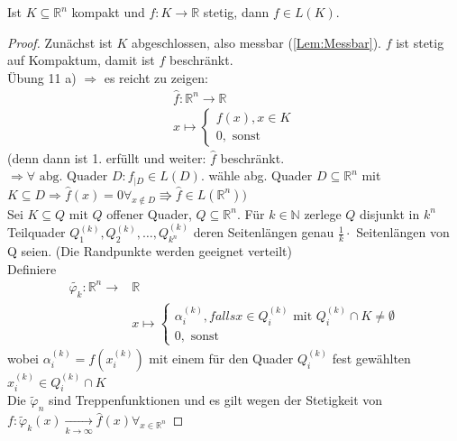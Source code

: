 \begin{satz}
    Ist $K\subseteq\mathbb{R}^n$ kompakt und $f\colon K\to\mathbb{R}$ stetig, dann $f\in L(K)$.
\end{satz}

\begin{proof}
        Zunächst ist $K$ abgeschlossen, also messbar (\ref{Lem:Messbar}). $f$ ist stetig auf Kompaktum, damit ist $f$ beschränkt.\\
        Übung 11 a) $\Rightarrow$ es reicht zu zeigen: \begin{align*}
            \hat{f}\colon \mathbb{R}^n\to\mathbb{R}\\
            x\mapsto\left\{\begin{matrix*}
                f(x), x\in K\\
                0, \text{ sonst}
            \end{matrix*}\right.
        \end{align*}
        (denn dann ist 1. erfüllt und weiter: $\hat{f}$ beschränkt. $\Rightarrow \forall \text{ abg. Quader } D\colon f_{|D}\in L(D)$. wähle abg. Quader $D\subseteq\mathbb{R}^n$ mit $K\subseteq D \Rightarrow \hat{f}(x) = 0 \forall_{x\notin D} \Rrightarrow \hat{f}\in L(\mathbb{R}^n))$\\
        Sei $K\subseteq Q$ mit $Q$ offener Quader, $Q \subseteq \mathbb{R}^n$. Für $k\in\mathbb{N}$ zerlege $Q$ disjunkt in $k^n$ Teilquader $Q_1^{(k)}, Q_2^{(k)}, \dots , Q_{k^n}^{(k)}$ deren Seitenlängen genau $\frac{1}{k} \cdot$ Seitenlängen von Q seien. (Die Randpunkte werden geeignet verteilt)\\
        Definiere \begin{align*}
            \tilde{\varphi_k}\colon \mathbb{R}^n\to&\mathbb{R}\\
            & x\mapsto\left\{\begin{matrix*}
                \alpha_i^{(k)}, falls x\in Q_i^{(k)} \text{ mit } Q_i^{(k)} \cap K \neq \emptyset\\
                0, \text{ sonst}
            \end{matrix*}\right.
        \end{align*} wobei $\alpha_i^{(k)} = f(x_i^{(k)})$ mit einem für den Quader $Q_i^{(k)}$ fest gewählten $x_i^{(k)} \in Q_i^{(k)} \cap K$\\
        Die $\tilde{\varphi}_n$ sind Treppenfunktionen und es gilt wegen der Stetigkeit von $f: \tilde{\varphi}_k(x) \xrightarrow[k\to\infty]{} \hat{f}(x) \forall_{x\in\mathbb{R}^n}$
\end{proof}

